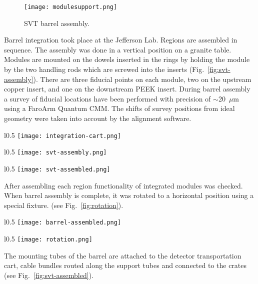 \begin{figure}[hbt]
\centering 
\texttt{[image: modulesupport.png]}
\caption{SVT barrel assembly.}
\label{fig:modulesupport}
\end{figure}

Barrel integration took place at the Jefferson Lab. Regions are assembled in sequence. The assembly was done in a vertical position on a granite table. Modules are mounted on the dowels inserted in the rings by holding the module by the two handling rods which are screwed into the inserts (Fig.~\ref{fig:svt-assembly}). There are three fiducial points on each module, two on the upstream copper insert, and one on the downstream PEEK insert. During barrel assembly a survey of fiducial locations have been performed with precision of $\sim$20~$\mu$m using a FaroArm Quantum CMM. The shifts of survey positions from ideal geometry were taken into account by the alignment software. 

\begin{wrapfigure}{l}{0.5\columnwidth}
\texttt{[image: integration-cart.png]}
\caption{Integration cart.}
\label{fig:integration-cart}
\end{wrapfigure}

\begin{wrapfigure}{l}{0.5\columnwidth}
\texttt{[image: svt-assembly.png]}
\caption{SVT assembly}
\label{fig:svt-assembly}
\end{wrapfigure}

\begin{wrapfigure}{l}{0.5\columnwidth}
\texttt{[image: svt-assembled.png]}
\caption{SVT after integration.}
\label{fig:svt-assembled}
\end{wrapfigure}

After assembling each region functionality of integrated modules was checked. When barrel assembly is complete, it was rotated to a horizontal position using a special fixture. (see Fig.~\ref{fig:rotation}).

\begin{wrapfigure}{l}{0.5\columnwidth}
\texttt{[image: barrel-assembled.png]}
\caption{Assembled barrel}
\label{fig:barrel-assembled}
\end{wrapfigure}

%
\begin{wrapfigure}{l}{0.5\columnwidth}
\texttt{[image: rotation.png]}
\caption{Barrel rotation.}
\label{fig:rotation}
\end{wrapfigure}

The mounting tubes of the barrel are attached to the detector transportation cart, cable bundles routed along the support tubes and connected to the crates (see Fig.~\ref{fig:svt-assembled}).  

